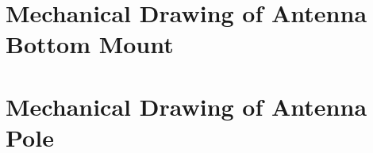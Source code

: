 \section{Mechanical Drawing of Antenna Bottom Mount} \label{appendix_mechanical_drawing_antenna_bottom_mount}
\enlargethispage{2.5cm}
\begin{adjustwidth}{0.23cm}{0cm} \hfuzz=7.0pt \vfuzz=20.0pt
\end{adjustwidth}
\newpage

\section{Mechanical Drawing of Antenna Pole} \label{appendix_mechanical_drawing_antenna_pole}
\enlargethispage{2.5cm}
\begin{adjustwidth}{-0.23cm}{0cm} \hfuzz=7.0pt \vfuzz=20.0pt
\end{adjustwidth}
\newpage
